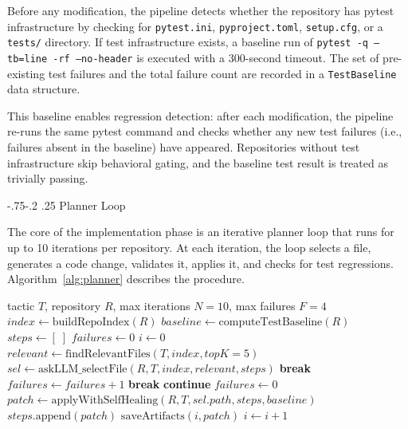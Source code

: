 \documentclass[sigconf,review,anonymous]{acmart}
\makeatletter
\renewcommand\subsubsection{\def\@toclevel{3}%
  \@startsection{subsubsection}{3}{\z@}%
  {-.75\baselineskip \@plus -2\p@ \@minus -.2\p@}%
  {.25\baselineskip}%
  {\ACM@NRadjust{\sffamily\bfseries\section@raggedright}}}
\makeatother
\begin{document}
Before any modification, the pipeline detects whether the repository has pytest infrastructure by checking for \texttt{pytest.ini}, \texttt{pyproject.toml}, \texttt{setup.cfg}, or a \texttt{tests/} directory. If test infrastructure exists, a baseline run of \texttt{pytest -q --tb=line -rf --no-header} is executed with a 300-second timeout. The set of pre-existing test failures and the total failure count are recorded in a \texttt{TestBaseline} data structure.

This baseline enables regression detection: after each modification, the pipeline re-runs the same pytest command and checks whether any new test failures (i.e., failures absent in the baseline) have appeared. Repositories without test infrastructure skip behavioral gating, and the baseline test result is treated as trivially passing.

\subsubsection{Planner Loop}

The core of the implementation phase is an iterative planner loop that runs for up to 10 iterations per repository. At each iteration, the loop selects a file, generates a code change, validates it, applies it, and checks for test regressions. Algorithm~\ref{alg:planner} describes the procedure.

\begin{algorithm}[H]
\caption{Planner loop for tactic implementation}
\label{alg:planner}
\begin{algorithmic}[1]
\Require tactic $T$, repository $R$, max iterations $N = 10$, max failures $F = 4$
\State $index \gets \text{buildRepoIndex}(R)$
\State $baseline \gets \text{computeTestBaseline}(R)$
\State $steps \gets [\;]$
\State $failures \gets 0$
\State $i \gets 0$
    \State $relevant \gets \text{findRelevantFiles}(T, index, topK=5)$ 
    \State $sel \gets \text{askLLM\_selectFile}(R, T, index, relevant, steps)$
        \State \textbf{break}
    \EndIf
        \State $failures \gets failures + 1$
            \State \textbf{break} 
        \EndIf
        \State \textbf{continue}
    \EndIf
    \State $failures \gets 0$
    \State $patch \gets \text{applyWithSelfHealing}(R, T, sel.path, steps, baseline)$
        \State $steps.\text{append}(patch)$
        \State $\text{saveArtifacts}(i, patch)$
    \EndIf
    \State $i \gets i + 1$
\EndWhile
\end{algorithmic}
\end{algorithm}
\end{document}
